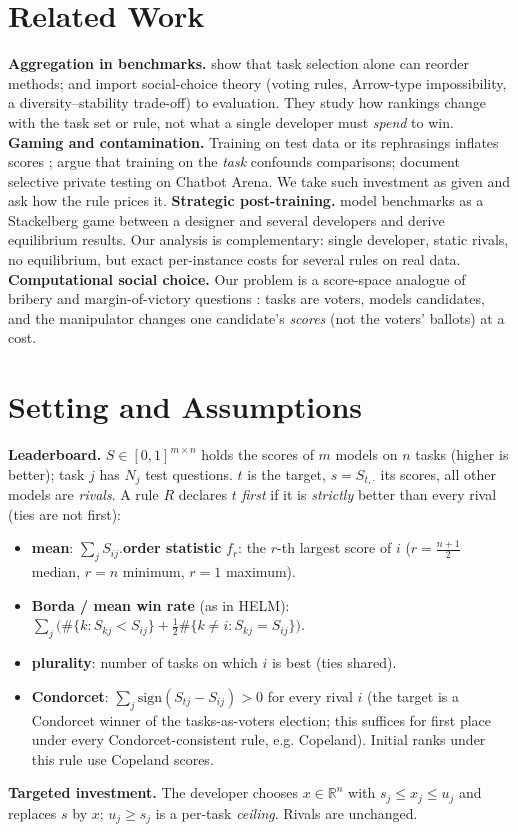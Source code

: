 \documentclass{article}
\theoremstyle{plain}
\theoremstyle{definition}
\theoremstyle{remark}
\begin{document}
\section{Related Work}
\textbf{Aggregation in benchmarks.}
\citet{dehghani2021benchmark} show that task selection alone can reorder methods; \citet{lanctot2023evaluating} and \citet{zhang2024diversity} import social-choice theory (voting rules, Arrow-type impossibility, a diversity--stability trade-off) to evaluation. They study how rankings change with the task set or rule, not what a single developer must \emph{spend} to win.
\textbf{Gaming and contamination.}
Training on test data or its rephrasings inflates scores \cite{zhou2023dont,yang2023rethinking}; \citet{dominguez2024training} argue that training on the \emph{task} confounds comparisons; \citet{singh2025leaderboard} document selective private testing on Chatbot Arena. We take such investment as given and ask how the rule prices it.
\textbf{Strategic post-training.}
\citet{chen2026leaderboard} model benchmarks as a Stackelberg game between a designer and several developers and derive equilibrium results. Our analysis is complementary: single developer, static rivals, no equilibrium, but exact per-instance costs for several rules on real data.
\textbf{Computational social choice.}
Our problem is a score-space analogue of bribery and margin-of-victory questions \cite{faliszewski2009bribery,brandt2016handbook}: tasks are voters, models candidates, and the manipulator changes one candidate's \emph{scores} (not the voters' ballots) at a cost.

\section{Setting and Assumptions}\label{sec:setup}
\textbf{Leaderboard.} $S\in[0,1]^{m\times n}$ holds the scores of $m$ models on $n$ tasks (higher is better); task $j$ has $N_j$ test questions. $t$ is the target, $s=S_{t,\cdot}$ its scores, all other models are \emph{rivals}.
A rule $R$ declares $t$ \emph{first} if it is \emph{strictly} better than every rival (ties are not first):
\begin{itemize}\itemsep0pt
\item \textbf{mean}: $\sum_j S_{ij}$.\quad \textbf{order statistic} $f_r$: the $r$-th largest score of $i$ ($r{=}\tfrac{n+1}{2}$ median, $r{=}n$ minimum, $r{=}1$ maximum).
\item \textbf{Borda / mean win rate} (as in HELM): $\sum_j\big(\#\{k:S_{kj}<S_{ij}\}+\tfrac12\#\{k\neq i:S_{kj}=S_{ij}\}\big)$.
\item \textbf{plurality}: number of tasks on which $i$ is best (ties shared).
\item \textbf{Condorcet}: $\sum_j \mathrm{sign}(S_{tj}-S_{ij})>0$ for every rival $i$ (the target is a Condorcet winner of the tasks-as-voters election; this suffices for first place under every Condorcet-consistent rule, e.g. Copeland). Initial ranks under this rule use Copeland scores.
\end{itemize}
\textbf{Targeted investment.} The developer chooses $x\in\mathbb{R}^n$ with $s_j\le x_j\le u_j$ and replaces $s$ by $x$; $u_j\ge s_j$ is a per-task \emph{ceiling}. Rivals are unchanged.
\end{document}
